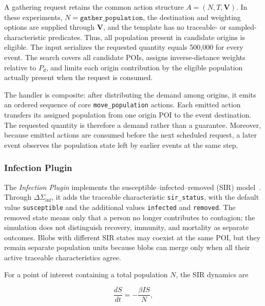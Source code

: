 A gathering request retains the common action structure $A=(N,T,\bm{V})$. In these experiments, $N=\texttt{gather\_population}$, the destination and weighting options are supplied through $\bm{V}$, and the template has no traceable- or sampled-characteristic predicates. Thus, all population present in candidate origins is eligible. The input serializes the requested quantity equals 500,000 for every event. The search covers all candidate POIs, assigns inverse-distance weights relative to $P_d$, and limits each origin contribution by the eligible population actually present when the request is consumed.

The handler is composite: after distributing the demand among origins, it emits an ordered sequence of core \texttt{move\_population} actions. Each emitted action transfers its assigned population from one origin POI to the event destination. The requested quantity is therefore a demand rather than a guarantee. Moreover, because emitted actions are consumed before the next scheduled request, a later event observes the population state left by earlier events at the same step. %

\subsubsection{Infection Plugin}

The \textit{Infection Plugin} implements the susceptible--infected--removed (SIR) model~\cite{kermack1927contribution}. Through $\Delta\Sigma_{\mathrm{inf}}$, it adds the traceable characteristic \texttt{sir\_status}, with the default value \texttt{susceptible} and the additional values \texttt{infected} and \texttt{removed}. The removed state means only that a person no longer contributes to contagion; the simulation does not distinguish recovery, immunity, and mortality as separate outcomes. Blobs with different SIR states may coexist at the same POI, but they remain separate population units because blobs can merge only when all their active traceable characteristics agree.

For a point of interest containing a total population $N$, the SIR dynamics are

\begin{equation}
\label{eq:large_scale_epidemic_delta_s}
   \frac{dS}{dt}=-\frac{\beta I S}{N},
\end{equation}

